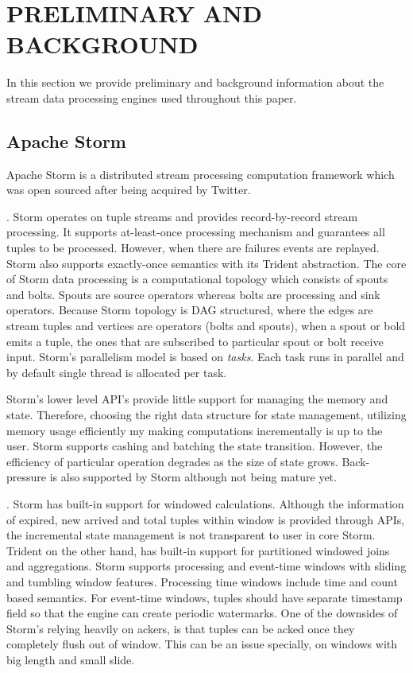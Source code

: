 \section{PRELIMINARY AND BACKGROUND}
\label{pre}

In this section we provide preliminary and background information about the stream data processing engines used throughout this paper. 
\subsection{Apache Storm}

Apache Storm is a distributed stream processing computation framework which was open sourced after being acquired by Twitter. 


.
Storm operates on tuple streams and provides record-by-record stream processing. It supports at-least-once processing  mechanism and guarantees all tuples to be processed. However, when there are failures events are replayed. Storm also supports exactly-once semantics with its Trident abstraction. The core of Storm data processing is a computational topology which consists of spouts and bolts.  Spouts are source operators whereas bolts are processing and sink operators. Because Storm topology is DAG structured, where the edges are stream tuples and vertices are operators (bolts and spouts), when a spout or bold emits a tuple, the ones that are subscribed to particular spout or bolt receive input. Storm's parallelism model is based on \textit{tasks}. Each task runs in parallel and by default single thread is allocated per task. 

Storm's lower level API's provide little support for managing the memory and state. Therefore, choosing the right data structure for state management, utilizing memory usage efficiently my making computations incrementally  is up to the user. Storm supports cashing and batching the state transition. However, the efficiency of particular operation degrades as the size of state grows. Back-pressure is also supported by Storm  although not being mature yet.



.
Storm has built-in support for windowed calculations.  Although the information of expired, new arrived and total tuples within window is provided through APIs, the incremental state management is not transparent to user in core Storm. Trident on the other hand,  has built-in support for partitioned windowed joins and aggregations.  Storm supports processing and event-time windows with sliding and tumbling window features. Processing time windows include time and count based semantics. For event-time windows, tuples should have separate timestamp field so that the engine can create periodic watermarks. One of the downsides of Storm's relying heavily on ackers, is that tuples can be acked once they completely flush out of window. This can be an issue specially, on windows with big length and small slide.  



